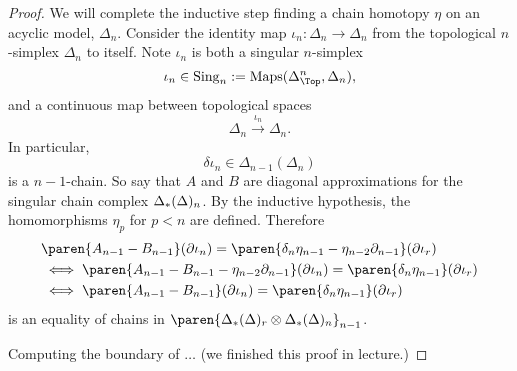 \documentclass[onesided]{ccg-pset}
\begin{document}
\begin{enumerate}
\begin{proof}
   We will complete the inductive step finding a chain homotopy $\eta$ on an {acyclic model}, $\Delta_n$. Consider the identity map $\iota_n \colon \Delta_n \to \Delta_n$ from the topological $n$-simplex $\Delta_n$ to itself. Note $\iota_n$ is both a singular $n$-simplex 
   \[\iota_n \in \sing \Delta_n := \mathrm{Maps}(\Delta^n_\Top, \Delta_n),\] and a continuous map between topological spaces 
   \[
      \Delta_n \xrightarrow{\iota_n} \Delta_n.
   \]
   In particular, \[\delta \iota_n \in \Delta_{n-1}(\Delta_n)\] is a $n-1$-chain. 
   So say that $A$ and $B$ are diagonal approximations for the singular chain complex $\Delta_{*}(\Delta)_n$.
   By the inductive hypothesis, the homomorphisms $\eta_p$ for $p < n$ are defined. Therefore
   \begin{align*}
      \label{indhypo}
      & \paren{A_{n-1} - B_{n-1}}(\partial\iota_n) = \paren{\delta_{n} \eta_{n-1} - \eta_{n-2} \partial_{n-1}}(\partial \iota_r) \\
      & \iff \paren{A_{n-1} - B_{n-1} - \eta_{n-2} \partial_{n-1}}(\partial\iota_n) =  \paren{\delta_{n} \eta_{n-1}}(\partial \iota_r) \\
      & \iff \paren{A_{n-1} - B_{n-1}}(\partial\iota_n) =  \paren{\delta_{n} \eta_{n-1}}(\partial \iota_r) 
   \end{align*}
   is an equality of chains in $\paren{\sich * \Delta_r \otimes \sich * \Delta_n}_{n-1}$. 

   Computing the boundary of $\ldots$ (we finished this proof in lecture.)
\end{proof}

\end{enumerate}
\end{document}
